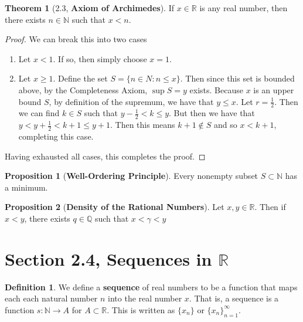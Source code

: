 \documentclass[12pt]{article}
\newcommand{\R}{\mathbb{R}}
\newcommand{\N}{\mathbb{N}}
\newcommand{\Q}{\mathbb{Q}}
\theoremstyle{definition}
\newtheorem*{thm}{Theorem}
\newtheorem*{definition}{Definition}
\newtheorem{prop}{Proposition}
\begin{document}
\begin{thm}[2.3, \textbf{Axiom of Archimedes}]

    If \( x \in \R \) is any real number, then there exists \( n \in \N \) such that \( x < n \).

    \begin{proof}
        We can break this into two cases
            \begin{enumerate}
                \item Let \( x < 1 \). If so, then simply choose \( x = 1 \).
                \item Let \( x \geq 1 \). Define the set \( S = \{ n \in N : n \leq x \} \). Then since this set is bounded above, by the Completeness Axiom, \( \sup S = y \) exists. Because \( x \) is an upper bound \( S \), by definition of the supremum, we have that \( y \leq x \).
                Let \( r  = \frac{1}{2} \). Then we can find \( k \in S \) such that \( y - \frac{1}{2}  < k \leq y \). But then we have that \( y <  y + \frac{1}{2} < k + 1 \leq y +1 \). Then this means \( k + 1 \not\in S \) and so \( x < k + 1\), completing this case.
            \end{enumerate}
        Having exhausted all cases, this completes the proof.
    \end{proof}
    
\end{thm}

\begin{prop}[\textbf{Well-Ordering Principle}]

    Every nonempty subset \( S \subset \N \) has a minimum. 

\end{prop}

\begin{prop}[\textbf{Density of the Rational Numbers}]

    Let \( x, y \in \R \). Then if \( x < y \), there exists \( q \in \Q \) such that \( x < \gamma < y \)
    
\end{prop}

\section*{Section 2.4, Sequences in \(\R\)}

\begin{definition}
    We define a \textbf{sequence} of real numbers to be a function that maps each each natural number \( n \) into the real number \( x \). That is, a sequence is a function \( s: \N \to A \) for \( A \subset \R \). This is written as \( \{ x_n \} \) or \( \{ x_n \}_{n=1}^{\infty} \).
\end{definition}
\end{document}
